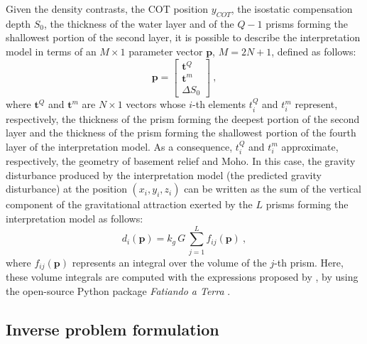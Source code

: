 \documentclass[manuscript]{geophysics}
\begin{document}
Given the density contrasts, the COT position $y_{COT}$, the isostatic compensation
depth $S_{0}$, the thickness of the water layer and of the $Q-1$ prisms forming the
shallowest portion of the second layer, it is possible to describe the interpretation
model in terms of an $M \times 1$ parameter vector $\mathbf{p}$, $M = 2N + 1$, defined
as follows:
\begin{equation}
\mathbf{p} = \begin{bmatrix}
\mathbf{t}^{Q} \\
\mathbf{t}^{m} \\
\Delta S_{0}
\end{bmatrix} \: ,
\label{eq:parameter-vector}
\end{equation}
where $\mathbf{t}^{Q}$ and $\mathbf{t}^{m}$ are $N \times 1$ vectors whose $i$-th
elements $t^{Q}_{i}$ and $t^{m}_{i}$ represent, respectively, the thickness of the
prism forming the deepest portion of the second layer and the thickness of the prism
forming the shallowest portion of the fourth layer of the interpretation model.
As a consequence, $t^{Q}_{i}$ and $t^{m}_{i}$ approximate, respectively, the geometry
of basement relief and Moho.
In this case, the gravity disturbance produced by the interpretation model (the
predicted gravity disturbance) at the position $(x_{i}, y_{i}, z_{i})$ can be written
as the sum of the vertical component of the gravitational attraction exerted by the $L$
prisms forming the interpretation model as follows:
\begin{equation}
d_{i}(\mathbf{p}) = k_{g} \, G \, \sum_{j = 1}^{L} f_{ij}(\mathbf{p}) \: ,
\label{eq:ith-predicted-data}
\end{equation}
where $f_{ij}(\mathbf{p})$ represents an integral over the volume of the $j$-th 
prism. Here, these volume integrals are computed with the expressions proposed 
by \citet{nagy-etal2000}, by using the open-source Python package 
\textit{Fatiando a Terra} \citep{uieda-etal2013}.


\subsection{Inverse problem formulation}
\end{document}
